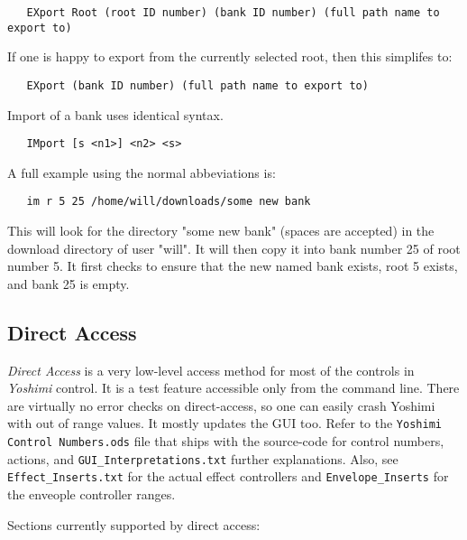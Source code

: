 \begin{verbatim}
   EXport Root (root ID number) (bank ID number) (full path name to export to)
\end{verbatim}

   If one is happy to export from the currently selected root, then this
   simplifes to:

\begin{verbatim}
   EXport (bank ID number) (full path name to export to)
\end{verbatim}

   Import of a bank uses identical syntax.

\begin{verbatim}
   IMport [s <n1>] <n2> <s>
\end{verbatim}

   A full example using the normal abbeviations is:

\begin{verbatim}
   im r 5 25 /home/will/downloads/some new bank
\end{verbatim}

   This will look for the directory "some new bank" (spaces are accepted) in
   the download directory of user "will". It will then copy it into bank number
   25 of root number 5. It first checks to ensure that the new named bank
   exists, root 5 exists, and bank 25 is empty.

\subsection{Direct Access}
\label{subsec:command_line_direct_access}

   \textsl{Direct Access} is a very low-level access method for most of the
   controls in \textsl{Yoshimi} control.
   It is a test feature accessible only from the command line.
   There are virtually no error checks on direct-access, so one can easily
   crash Yoshimi with out of range values.
   It mostly updates the GUI too.
   Refer to the \texttt{Yoshimi Control Numbers.ods} file that ships with the
   source-code
   for control numbers, actions, and \texttt{GUI\_Interpretations.txt}
   further explanations.
   Also, see \texttt{Effect\_Inserts.txt} for the actual effect controllers and
   \texttt{Envelope\_Inserts} for the enveople controller ranges.

   Sections currently supported by direct access:

